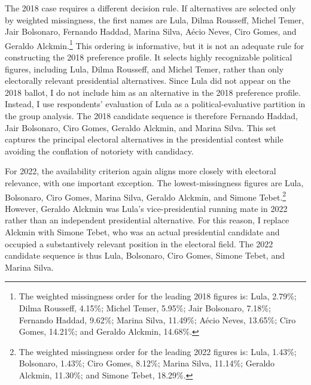 \documentclass[12pt]{article}
\begin{document}
The 2018 case requires a different decision rule. If alternatives are selected
only by weighted missingness, the first names are Lula, Dilma Rousseff, Michel
Temer, Jair Bolsonaro, Fernando Haddad, Marina Silva, Aécio Neves, Ciro Gomes,
and Geraldo Alckmin.\footnote{The weighted missingness order for the leading
2018 figures is: Lula, 2.79\%; Dilma Rousseff, 4.15\%; Michel Temer, 5.95\%;
Jair Bolsonaro, 7.18\%; Fernando Haddad, 9.62\%; Marina Silva, 11.49\%; Aécio
Neves, 13.65\%; Ciro Gomes, 14.21\%; and Geraldo Alckmin, 14.68\%.} This
ordering is informative, but it is not an adequate rule for constructing the
2018 preference profile. It selects highly recognizable political figures,
including Lula, Dilma Rousseff, and Michel Temer, rather than only electorally
relevant presidential alternatives. Since Lula did not appear on the 2018
ballot, I do not include him as an alternative in the 2018 preference profile.
Instead, I use respondents' evaluation of Lula as a political-evaluative
partition in the group analysis. The 2018 candidate sequence is therefore
Fernando Haddad, Jair Bolsonaro, Ciro Gomes, Geraldo Alckmin, and Marina Silva.
This set captures the principal electoral alternatives in the presidential
contest while avoiding the conflation of notoriety with candidacy.

For 2022, the availability criterion again aligns more closely with electoral
relevance, with one important exception. The lowest-missingness figures are
Lula, Bolsonaro, Ciro Gomes, Marina Silva, Geraldo Alckmin, and Simone
Tebet.\footnote{The weighted missingness order for the leading 2022 figures is:
Lula, 1.43\%; Bolsonaro, 1.43\%; Ciro Gomes, 8.12\%; Marina Silva, 11.14\%;
Geraldo Alckmin, 11.30\%; and Simone Tebet, 18.29\%.} However, Geraldo Alckmin
was Lula's vice-presidential running mate in 2022 rather than an independent
presidential alternative. For this reason, I replace Alckmin with Simone Tebet,
who was an actual presidential candidate and occupied a substantively relevant
position in the electoral field. The 2022 candidate sequence is thus Lula,
Bolsonaro, Ciro Gomes, Simone Tebet, and Marina Silva.





% 
\end{document}
